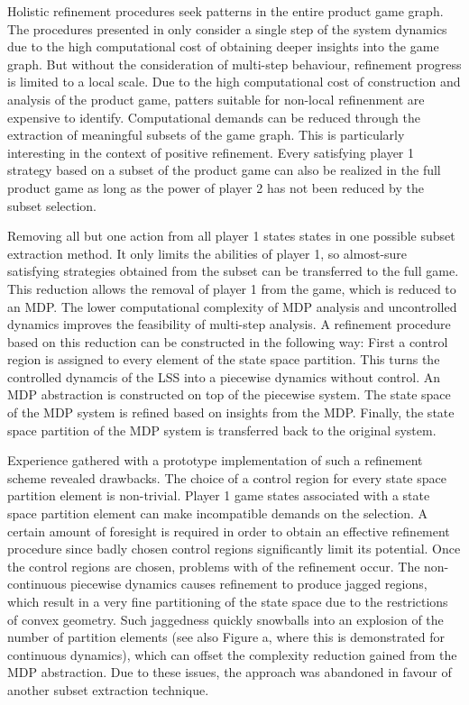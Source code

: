 Holistic refinement procedures seek patterns in the entire product game graph.
The procedures presented in  only consider a single step of the system dynamics due to the high computational cost of obtaining deeper insights into the game graph.
But without the consideration of multi-step behaviour, refinement progress is limited to a local scale.
Due to the high computational cost of construction and analysis of the product game, patters suitable for non-local refinenment are expensive to identify.
Computational demands can be reduced through the extraction of meaningful subsets of the game graph.
This is particularly interesting in the context of positive refinement.
Every satisfying player 1 strategy based on a subset of the product game can also be realized in the full product game as long as the power of player 2 has not been reduced by the subset selection.

Removing all but one action from all player 1 states states in one possible subset extraction method.
It only limits the abilities of player 1, so almost-sure satisfying strategies obtained from the subset can be transferred to the full game.
This reduction allows the removal of player 1 from the game, which is reduced to an MDP.
The lower computational complexity of MDP analysis and uncontrolled dynamics improves the feasibility of multi-step analysis.
A refinement procedure based on this reduction can be constructed in the following way:
First a control region is assigned to every element of the state space partition.
This turns the controlled dynamcis of the LSS into a piecewise dynamics without control.
An MDP abstraction is constructed on top of the piecewise system.
The state space of the MDP system is refined based on insights from the MDP.
Finally, the state space partition of the MDP system is transferred back to the original system.

Experience gathered with a prototype implementation of such a refinement scheme revealed drawbacks.
The choice of a control region for every state space partition element is non-trivial.
Player 1 game states associated with a state space partition element can make incompatible demands on the selection.
A certain amount of foresight is required in order to obtain an effective refinement procedure since badly chosen control regions significantly limit its potential.
Once the control regions are chosen, problems with  of the refinement occur.
The non-continuous piecewise dynamics causes refinement to produce jagged regions, which result in a very fine partitioning of the state space due to the restrictions of convex geometry.
Such jaggedness quickly snowballs into an explosion of the number of partition elements (see also Figure a, where this is demonstrated for continuous dynamics), which can offset the complexity reduction gained from the MDP abstraction.
Due to these issues, the approach was abandoned in favour of another subset extraction technique.

